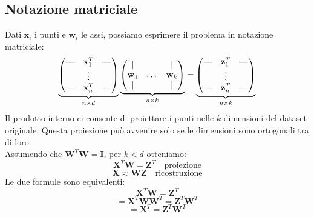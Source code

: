 \documentclass{article}
\newcommand*{\horzbar}{\rule[.5ex]{2.5ex}{0.5pt}}
\begin{document}
        \subsection{Notazione matriciale}
            Dati $\mathbf{x}_i$ i punti e $\mathbf{w}_i$ le assi, possiamo esprimere il problema in notazione 
            matriciale:
                \[\underbrace{\begin{pmatrix}
                    \horzbar & \mathbf{x}_1^T & \horzbar \\
                    & \vdots & \\
                    \horzbar & \mathbf{x}_n^T & \horzbar
                \end{pmatrix}}_{n\times d}
                \underbrace{
                    \begin{pmatrix}
                        | & & | \\
                        \mathbf{w}_1 & \dots & \mathbf{w}_k\\
                        | & & |
                    \end{pmatrix}}_{d \times k} =
                 \underbrace{\begin{pmatrix}
                    \horzbar & \mathbf{z}_1^T & \horzbar \\
                    & \vdots & \\
                    \horzbar & \mathbf{z}_n^T & \horzbar
                \end{pmatrix}}_{n \times k}\]
            Il prodotto interno ci consente di proiettare i punti nelle $k$ dimensioni del dataset originale. Questa 
            proiezione può avvenire solo se le dimensioni sono ortogonali tra di loro. \\
            Assumendo che $\mathbf{W}^T\mathbf{W} = \mathbf{I}$, per $k < d$ otteniamo:
            \[\mathbf{X}^T\mathbf{W} = \mathbf{Z}^T \quad \text{proiezione}\]
            \[\mathbf{X} \approx \mathbf{WZ} \quad \text{ricostruzione}\]
            Le due formule sono equivalenti:
            \begin{equation}
                \mathbf{X}^T\mathbf{W} = \mathbf{Z}^T
            \end{equation}
            \begin{equation}
               = \mathbf{X}^T\mathbf{WW}^T = \mathbf{Z}^T\mathbf{W}^T
            \end{equation}
            \begin{equation}
                =\mathbf{X}^T = \mathbf{Z}^T\mathbf{W}^T
            \end{equation}
\end{document}
